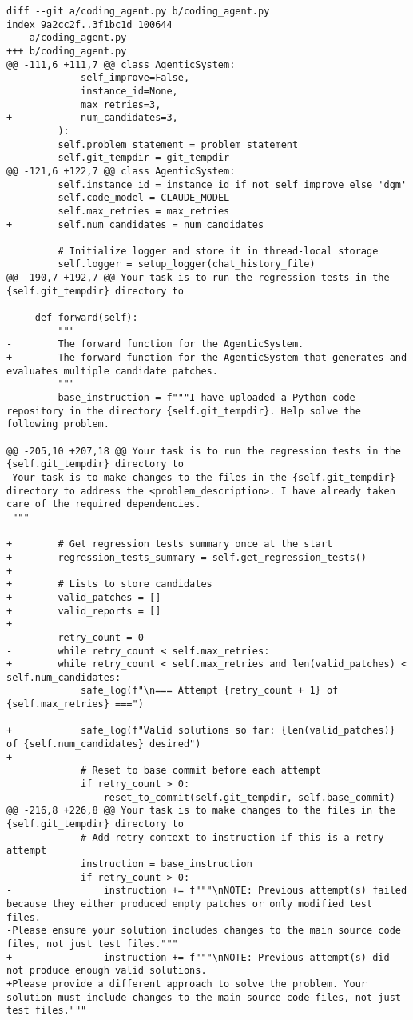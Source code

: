 \begin{lstlisting}[style=diffstyle]
diff --git a/coding_agent.py b/coding_agent.py
index 9a2cc2f..3f1bc1d 100644
--- a/coding_agent.py
+++ b/coding_agent.py
@@ -111,6 +111,7 @@ class AgenticSystem:
             self_improve=False,
             instance_id=None,
             max_retries=3,
+            num_candidates=3,
         ):
         self.problem_statement = problem_statement
         self.git_tempdir = git_tempdir
@@ -121,6 +122,7 @@ class AgenticSystem:
         self.instance_id = instance_id if not self_improve else 'dgm'
         self.code_model = CLAUDE_MODEL
         self.max_retries = max_retries
+        self.num_candidates = num_candidates
 
         # Initialize logger and store it in thread-local storage
         self.logger = setup_logger(chat_history_file)
@@ -190,7 +192,7 @@ Your task is to run the regression tests in the {self.git_tempdir} directory to
 
     def forward(self):
         """
-        The forward function for the AgenticSystem.
+        The forward function for the AgenticSystem that generates and evaluates multiple candidate patches.
         """
         base_instruction = f"""I have uploaded a Python code repository in the directory {self.git_tempdir}. Help solve the following problem.
 
@@ -205,10 +207,18 @@ Your task is to run the regression tests in the {self.git_tempdir} directory to
 Your task is to make changes to the files in the {self.git_tempdir} directory to address the <problem_description>. I have already taken care of the required dependencies.
 """
 
+        # Get regression tests summary once at the start
+        regression_tests_summary = self.get_regression_tests()
+
+        # Lists to store candidates
+        valid_patches = []
+        valid_reports = []
+
         retry_count = 0
-        while retry_count < self.max_retries:
+        while retry_count < self.max_retries and len(valid_patches) < self.num_candidates:
             safe_log(f"\n=== Attempt {retry_count + 1} of {self.max_retries} ===")
-            
+            safe_log(f"Valid solutions so far: {len(valid_patches)} of {self.num_candidates} desired")
+
             # Reset to base commit before each attempt
             if retry_count > 0:
                 reset_to_commit(self.git_tempdir, self.base_commit)
@@ -216,8 +226,8 @@ Your task is to make changes to the files in the {self.git_tempdir} directory to
             # Add retry context to instruction if this is a retry attempt
             instruction = base_instruction
             if retry_count > 0:
-                instruction += f"""\nNOTE: Previous attempt(s) failed because they either produced empty patches or only modified test files. 
-Please ensure your solution includes changes to the main source code files, not just test files."""
+                instruction += f"""\nNOTE: Previous attempt(s) did not produce enough valid solutions. 
+Please provide a different approach to solve the problem. Your solution must include changes to the main source code files, not just test files."""
 

\end{lstlisting}
